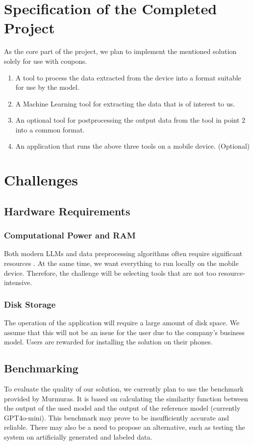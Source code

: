 \documentclass[12pt]{article}
\begin{document}
\section*{Specification of the Completed Project}
As the core part of the project, we plan to implement the mentioned solution solely for use with coupons.
\begin{enumerate}
    \item A tool to process the data extracted from the device into a format suitable for use by the model.
    \item A Machine Learning tool for extracting the data that is of interest to us.
    \item An optional tool for postprocessing the output data from the tool in point 2 into a common format.
    \item An application that runs the above three tools on a mobile device. (Optional)
\end{enumerate}

\section*{Challenges}

\subsection*{Hardware Requirements}

\subsubsection*{Computational Power and RAM}
Both modern LLMs and data preprocessing algorithms often require significant resources \cite{LLMmobile2024}. At the same time, we want everything to run locally on the mobile device. Therefore, the challenge will be selecting tools that are not too resource-intensive.

\subsubsection*{Disk Storage}
The operation of the application will require a large amount of disk space. We assume that this will not be an issue for the user due to the company's business model. Users are rewarded for installing the solution on their phones.

\subsection*{Benchmarking}
To evaluate the quality of our solution, we currently plan to use the benchmark provided by Murmuras. It is based on calculating the similarity function between the output of the used model and the output of the reference model (currently GPT4o-mini). This benchmark may prove to be insufficiently accurate and reliable. There may also be a need to propose an alternative, such as testing the system on artificially generated and labeled data.
\end{document}
